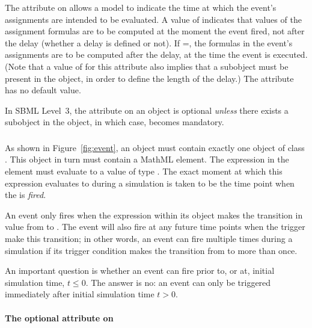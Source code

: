 The attribute  on \Event allows a
model to indicate the time at which the event's assignments are
intended to be evaluated.  A value of  indicates that
values of the assignment formulas are to be computed at the moment
the event fired, not after the delay (whether a delay is defined
or not).  If =, the
formulas in the event's assignments are to be computed after the
delay, at the time the event is executed.  (Note that a value of
 for this attribute also implies that a \Delay
subobject must be present in the \Event object, in order to define
the length of the delay.)  The attribute has no default value.

In SBML Level~3, the attribute  on
an \Event object is optional \emph{unless} there exists a \Delay
subobject in the \Event object, in which case,
 becomes mandatory.


\subsubsection{}
\label{sec:trigger}
\label{sec:event-trigger}

As shown in Figure~\ref{fig:event}, an \Event object must contain
exactly one object of class \Trigger.  This \Trigger object in
turn must contain a MathML  element.  The expression
in the  element must evaluate to a value of type
.  The exact moment at which this expression
evaluates to  during a simulation is taken to be the
time point when the \Event is \emph{fired}.

An event only fires when the expression within its \Trigger object
makes the transition in value from  to .  The
event will also fire at any future time points when the trigger
make this transition; in other words, an event can fire multiple
times during a simulation if its trigger condition makes the
transition from  to  more than once.

An important question is whether an event can fire prior to, or
at, initial simulation time, \ie $t \leq 0$.  The answer is no: an
event can only be triggered immediately after initial simulation
time \ie $t > 0$.


\paragraph{The optional  attribute on }
\label{sec:trigger-sboterm}

